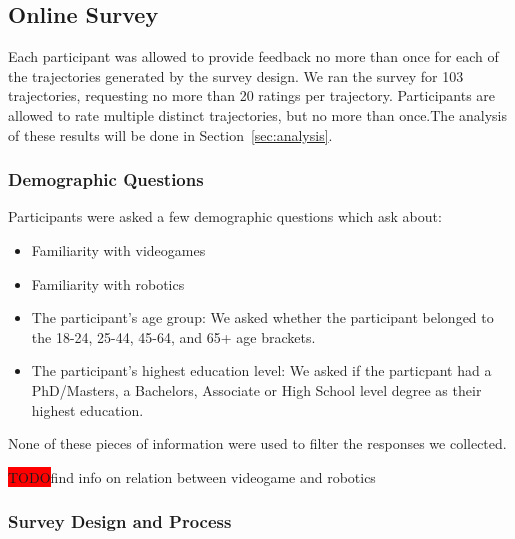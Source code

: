 \documentclass[letterpaper, 10 pt, conference]{ieeeconf}  %
\newcommand{\todo}{\colorbox{red}{TODO}}
\begin{document}
\subsection{Online Survey}


Each participant was allowed to provide feedback no more than once for each of the trajectories generated by the survey design. We ran the survey for 103 trajectories, requesting no more than 20 ratings per trajectory. Participants are allowed to rate multiple distinct trajectories, but no more than once.The analysis of these results will be done in Section~\ref{sec:analysis}.

\subsubsection{Demographic Questions}

Participants were asked a few demographic questions which ask about:

\begin{itemize}
\item Familiarity with videogames
\item Familiarity with robotics
\item The participant's age group: We asked whether the participant belonged to the 18-24, 25-44, 45-64, and 65+ age brackets.
\item The participant's highest education level: We asked if the particpant had a PhD/Masters, a Bachelors, Associate or High School level degree as their highest education.
\end{itemize}

None of these pieces of information were used to filter the responses we collected.

\todo find info on relation between videogame and robotics

\subsubsection{Survey Design and Process}
\end{document}
